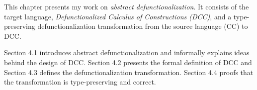 
This chapter presents my work on \textit{abstract defunctionalization}. It consists of the target language, \textit{Defunctionalized Calculus of Constructions (DCC)}, and a type-preserving defunctionalization transformation from the source language (CC) to DCC. 

Section 4.1 introduces abstract defunctionalization and informally explains ideas behind the design of DCC. Section 4.2 presents the formal definition of DCC and Section 4.3 defines the defunctionalization transformation. Section 4.4 proofs that the transformation is type-preserving and correct. 





